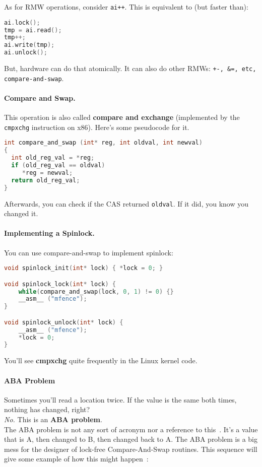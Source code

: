 As for RMW operations, consider {\tt ai++}. This is equivalent to (but faster than):

\begin{lstlisting}[language=C++]
ai.lock();
tmp = ai.read(); 
tmp++; 
ai.write(tmp);
ai.unlock();
\end{lstlisting}
But, hardware can do that atomically. It can also do other RMWs: {\tt +-, \&=, etc, compare-and-swap}.

\paragraph{Compare and Swap.} This operation is also called {\bf compare and exchange} (implemented by the {\tt cmpxchg} instruction on x86).
Here's some pseudocode for it.
  \begin{lstlisting}[language=C]
int compare_and_swap (int* reg, int oldval, int newval) 
{
  int old_reg_val = *reg;
  if (old_reg_val == oldval) 
     *reg = newval;
  return old_reg_val;
}
  \end{lstlisting}

Afterwards, you can check if the CAS returned {\tt oldval}. If it did, you know you changed it.


\paragraph{Implementing a Spinlock.}
You can use compare-and-swap to implement spinlock:
  \begin{lstlisting}[language=C]
void spinlock_init(int* lock) { *lock = 0; }

void spinlock_lock(int* lock) {
    while(compare_and_swap(lock, 0, 1) != 0) {}
    __asm__ ("mfence");
}

void spinlock_unlock(int* lock) {
    __asm__ ("mfence");
    *lock = 0;  
}
  \end{lstlisting}
You'll see {\bf cmpxchg} quite frequently in the Linux kernel code.

\paragraph{ABA Problem}
Sometimes you'll read a location twice.
If the value is the same both times, nothing has changed, right?\\[1em]

\emph{No.} This is an {\bf ABA problem}.\\[1em]

The ABA problem is not any sort of acronym nor a reference to this~\cite{abba}. It's a value that is A, then changed to B, then changed back to A. The ABA problem is a big mess for the designer of lock-free Compare-And-Swap routines. This sequence will give some example of how this might happen~\cite{abaproblem}:


